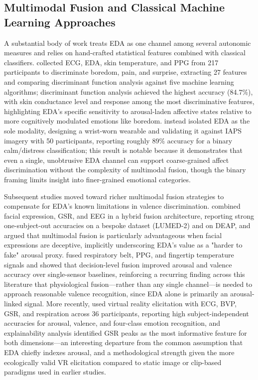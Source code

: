 \subsection{Multimodal Fusion and Classical Machine Learning Approaches}
A substantial body of work treats EDA as one channel among several autonomic measures and relies on hand-crafted statistical features combined with classical classifiers. \cite{jang2015analysis} collected ECG, EDA, skin temperature, and PPG from 217 participants to discriminate boredom, pain, and surprise, extracting 27 features and comparing discriminant function analysis against five machine learning algorithms; discriminant function analysis achieved the highest accuracy (84.7\%), with skin conductance level and response among the most discriminative features, highlighting EDA's specific sensitivity to arousal-laden affective states relative to more cognitively modulated emotions like boredom. \cite{zangroniz2017electrodermal} instead isolated EDA as the sole modality, designing a wrist-worn wearable and validating it against IAPS imagery with 50 participants, reporting roughly 89\% accuracy for a binary calm/distress classification; this result is notable because it demonstrates that even a single, unobtrusive EDA channel can support coarse-grained affect discrimination without the complexity of multimodal fusion, though the binary framing limits insight into finer-grained emotional categories.

Subsequent studies moved toward richer multimodal fusion strategies to compensate for EDA's known limitations in valence discrimination. \cite{cimtay2020cross} combined facial expression, GSR, and EEG in a hybrid fusion architecture, reporting strong one-subject-out accuracies on a bespoke dataset (LUMED-2) and on DEAP, and argued that multimodal fusion is particularly advantageous when facial expressions are deceptive, implicitly underscoring EDA's value as a "harder to fake" arousal proxy. \cite{ayata2020emotion} fused respiratory belt, PPG, and fingertip temperature signals and showed that decision-level fusion improved arousal and valence accuracy over single-sensor baselines, reinforcing a recurring finding across this literature that physiological fusion---rather than any single channel---is needed to approach reasonable valence recognition, since EDA alone is primarily an arousal-linked signal. More recently, \cite{polo2025advancing} used virtual reality elicitation with ECG, BVP, GSR, and respiration across 36 participants, reporting high subject-independent accuracies for arousal, valence, and four-class emotion recognition, and explainability analysis identified GSR peaks as the most informative feature for both dimensions---an interesting departure from the common assumption that EDA chiefly indexes arousal, and a methodological strength given the more ecologically valid VR elicitation compared to static image or clip-based paradigms used in earlier studies.

